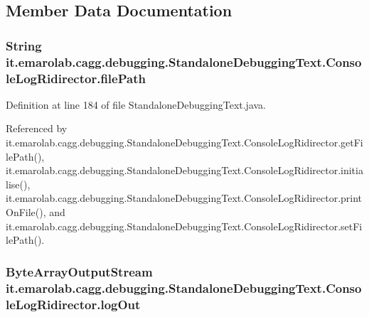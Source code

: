 \subsection{Member Data Documentation}
\hypertarget{classit_1_1emarolab_1_1cagg_1_1debugging_1_1StandaloneDebuggingText_1_1ConsoleLogRidirector_a870d183ab1015b37ba316062225c5ea5}{
\subsubsection[{file\-Path}]{\setlength{\rightskip}{0pt plus 5cm}String it.\-emarolab.\-cagg.\-debugging.\-Standalone\-Debugging\-Text.\-Console\-Log\-Ridirector.\-file\-Path\hspace{0.3cm}{\ttfamily [private]}}}\label{classit_1_1emarolab_1_1cagg_1_1debugging_1_1StandaloneDebuggingText_1_1ConsoleLogRidirector_a870d183ab1015b37ba316062225c5ea5}


Definition at line 184 of file Standalone\-Debugging\-Text.\-java.



Referenced by it.\-emarolab.\-cagg.\-debugging.\-Standalone\-Debugging\-Text.\-Console\-Log\-Ridirector.\-get\-File\-Path(), it.\-emarolab.\-cagg.\-debugging.\-Standalone\-Debugging\-Text.\-Console\-Log\-Ridirector.\-initialise(), it.\-emarolab.\-cagg.\-debugging.\-Standalone\-Debugging\-Text.\-Console\-Log\-Ridirector.\-print\-On\-File(), and it.\-emarolab.\-cagg.\-debugging.\-Standalone\-Debugging\-Text.\-Console\-Log\-Ridirector.\-set\-File\-Path().

\hypertarget{classit_1_1emarolab_1_1cagg_1_1debugging_1_1StandaloneDebuggingText_1_1ConsoleLogRidirector_a75347ea0b58cd07915d8c35268bea7ea}{
\subsubsection[{log\-Out}]{\setlength{\rightskip}{0pt plus 5cm}Byte\-Array\-Output\-Stream it.\-emarolab.\-cagg.\-debugging.\-Standalone\-Debugging\-Text.\-Console\-Log\-Ridirector.\-log\-Out\hspace{0.3cm}{\ttfamily [private]}}}\label{classit_1_1emarolab_1_1cagg_1_1debugging_1_1StandaloneDebuggingText_1_1ConsoleLogRidirector_a75347ea0b58cd07915d8c35268bea7ea}


